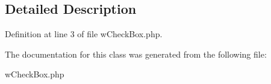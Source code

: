 \subsection{Detailed Description}


Definition at line 3 of file wCheckBox.php.



The documentation for this class was generated from the following file:\begin{DoxyCompactItemize}
\item 
wCheckBox.php\end{DoxyCompactItemize}
